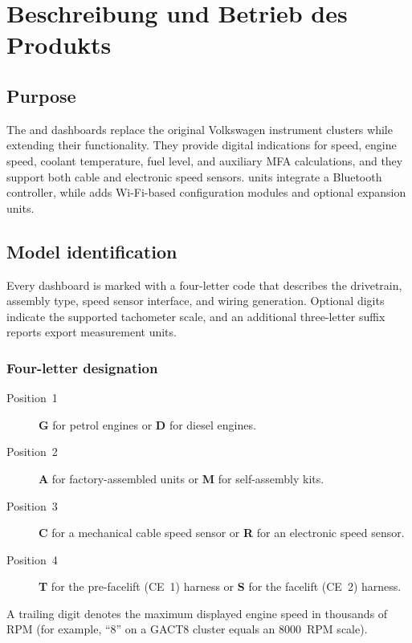 \chapter{Beschreibung und Betrieb des Produkts}\label{ch:description}

\section{Purpose}
The \ReplicaGenOne{} and \ReplicaNextLong{} dashboards replace the original Volkswagen instrument clusters while extending their functionality. They provide digital indications for speed, engine speed, coolant temperature, fuel level, and auxiliary MFA calculations, and they support both cable and electronic speed sensors. \ReplicaGenOneShort{} units integrate a Bluetooth controller, while \ReplicaNextShort{} adds Wi-Fi-based configuration modules and optional expansion units.

\section{Model identification}
Every dashboard is marked with a four-letter code that describes the drivetrain, assembly type, speed sensor interface, and wiring generation. Optional digits indicate the supported tachometer scale, and an additional three-letter suffix reports export measurement units.

\subsection{Four-letter designation}
\begin{description}
    \item[Position~1] \textbf{G} for petrol engines or \textbf{D} for diesel engines.
    \item[Position~2] \textbf{A} for factory-assembled units or \textbf{M} for self-assembly kits.
    \item[Position~3] \textbf{C} for a mechanical cable speed sensor or \textbf{R} for an electronic speed sensor.
    \item[Position~4] \textbf{T} for the pre-facelift (CE~1) harness or \textbf{S} for the facelift (CE~2) harness.
\end{description}
A trailing digit denotes the maximum displayed engine speed in thousands of RPM (for example, “8” on a GACT8 cluster equals an 8000~RPM scale).

